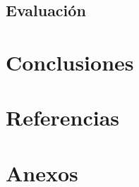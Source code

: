 \documentclass[letter]{article}
\begin{document}
\subsection{Evaluación}
\label{sec:org8d445e6}
\section{Conclusiones}
\label{sec:org37f8d30}

\section{Referencias}
\label{sec:orgc889cce}

\section{Anexos}
\label{sec:orgad8d800}
\end{document}
